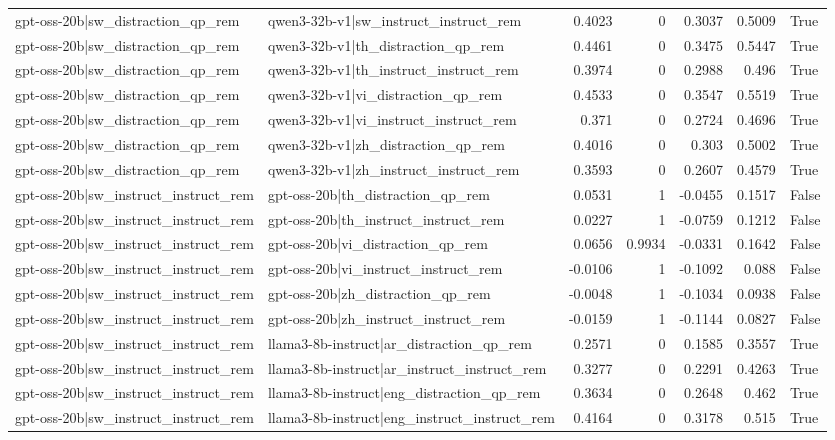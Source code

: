 \begin{table}
\begin{tabular}{l l r r r r l}
gpt-oss-20b|sw_distraction_qp_rem & qwen3-32b-v1|sw_instruct_instruct_rem & 0.4023 & 0 & 0.3037 & 0.5009 & True \\
gpt-oss-20b|sw_distraction_qp_rem & qwen3-32b-v1|th_distraction_qp_rem & 0.4461 & 0 & 0.3475 & 0.5447 & True \\
gpt-oss-20b|sw_distraction_qp_rem & qwen3-32b-v1|th_instruct_instruct_rem & 0.3974 & 0 & 0.2988 & 0.496 & True \\
gpt-oss-20b|sw_distraction_qp_rem & qwen3-32b-v1|vi_distraction_qp_rem & 0.4533 & 0 & 0.3547 & 0.5519 & True \\
gpt-oss-20b|sw_distraction_qp_rem & qwen3-32b-v1|vi_instruct_instruct_rem & 0.371 & 0 & 0.2724 & 0.4696 & True \\
gpt-oss-20b|sw_distraction_qp_rem & qwen3-32b-v1|zh_distraction_qp_rem & 0.4016 & 0 & 0.303 & 0.5002 & True \\
gpt-oss-20b|sw_distraction_qp_rem & qwen3-32b-v1|zh_instruct_instruct_rem & 0.3593 & 0 & 0.2607 & 0.4579 & True \\
gpt-oss-20b|sw_instruct_instruct_rem & gpt-oss-20b|th_distraction_qp_rem & 0.0531 & 1 & -0.0455 & 0.1517 & False \\
gpt-oss-20b|sw_instruct_instruct_rem & gpt-oss-20b|th_instruct_instruct_rem & 0.0227 & 1 & -0.0759 & 0.1212 & False \\
gpt-oss-20b|sw_instruct_instruct_rem & gpt-oss-20b|vi_distraction_qp_rem & 0.0656 & 0.9934 & -0.0331 & 0.1642 & False \\
gpt-oss-20b|sw_instruct_instruct_rem & gpt-oss-20b|vi_instruct_instruct_rem & -0.0106 & 1 & -0.1092 & 0.088 & False \\
gpt-oss-20b|sw_instruct_instruct_rem & gpt-oss-20b|zh_distraction_qp_rem & -0.0048 & 1 & -0.1034 & 0.0938 & False \\
gpt-oss-20b|sw_instruct_instruct_rem & gpt-oss-20b|zh_instruct_instruct_rem & -0.0159 & 1 & -0.1144 & 0.0827 & False \\
gpt-oss-20b|sw_instruct_instruct_rem & llama3-8b-instruct|ar_distraction_qp_rem & 0.2571 & 0 & 0.1585 & 0.3557 & True \\
gpt-oss-20b|sw_instruct_instruct_rem & llama3-8b-instruct|ar_instruct_instruct_rem & 0.3277 & 0 & 0.2291 & 0.4263 & True \\
gpt-oss-20b|sw_instruct_instruct_rem & llama3-8b-instruct|eng_distraction_qp_rem & 0.3634 & 0 & 0.2648 & 0.462 & True \\
gpt-oss-20b|sw_instruct_instruct_rem & llama3-8b-instruct|eng_instruct_instruct_rem & 0.4164 & 0 & 0.3178 & 0.515 & True \\

\end{tabular}
\end{table}
